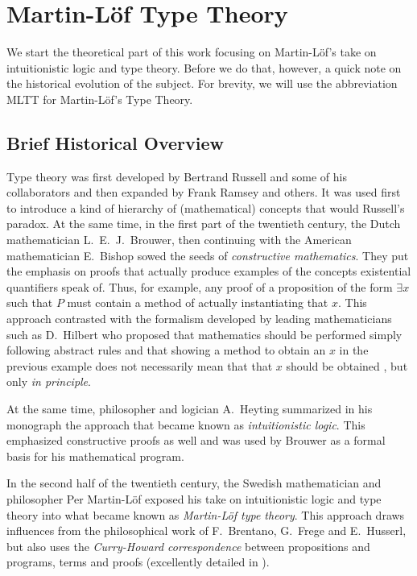 
\chapter{Martin-L\"of Type Theory}
\label{ch:mltt}


We start the theoretical part of this work focusing on Martin-L\"of's take
on intuitionistic logic and type theory. Before we do that, however, a quick
note on the historical evolution of the subject. For brevity, we will
use the abbreviation MLTT for Martin-L\"of's Type Theory.

\section{Brief Historical Overview}

Type theory was first developed by Bertrand Russell and some of his
collaborators and then expanded by Frank Ramsey and others. It was used
first to introduce a kind of hierarchy of (mathematical) concepts
that would  Russell's paradox. At the same time, in the first
part of the twentieth century, the Dutch mathematician L.\ E.\ J.\ Brouwer,
then continuing with the American mathematician E.\ Bishop sowed the seeds
of \emph{constructive mathematics}. They put the emphasis on proofs that
actually produce examples of the concepts existential quantifiers speak of.
Thus, for example, any proof of a proposition of the form $ \exists x $ such
that $ P $ must contain a method of actually instantiating that $ x $.
This approach contrasted with the formalism developed by leading mathematicians
such as D.\ Hilbert who proposed that mathematics should be performed
simply following abstract rules and that showing a method to obtain an $ x $
in the previous example does not necessarily mean that that $ x $ should be
obtained , but only \emph{in principle}.

At the same time, philosopher and logician A.\ Heyting summarized in his
monograph \cite{heyting} the approach that became known as
\emph{intuitionistic logic}. This emphasized constructive proofs as well
and was used by Brouwer as a formal basis for his mathematical program.

In the second half of the twentieth century, the Swedish mathematician and philosopher
Per Martin-L\"of exposed his take on intuitionistic logic and type theory
into what became known as \emph{Martin-L\"of type theory}. This approach
draws influences from the philosophical work of F.\ Brentano, G.\ Frege and
E.\ Husserl, but also uses the \emph{Curry-Howard correspondence} between
propositions and programs, terms and proofs (excellently detailed in \cite{ch}).

